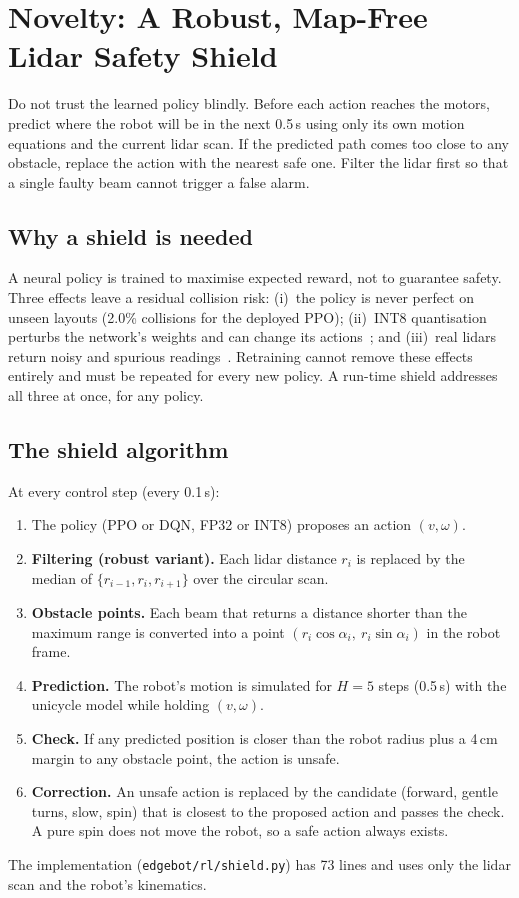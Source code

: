 \documentclass[12pt,a4paper,oneside]{report}
\begin{document}
\chapter{Novelty: A Robust, Map-Free Lidar Safety Shield}
\label{ch:novel}

\begin{tcolorbox}[novelty,title=\textbf{Key idea}]
Do not trust the learned policy blindly. Before each action reaches the motors, predict where the robot will be in
the next 0.5\,s using only its own motion equations and the current lidar scan. If the predicted path comes too
close to any obstacle, replace the action with the nearest safe one. Filter the lidar first so that a single faulty
beam cannot trigger a false alarm.
\end{tcolorbox}

\section{Why a shield is needed}
A neural policy is trained to maximise expected reward, not to guarantee safety. Three effects leave a residual
collision risk: (i)~the policy is never perfect on unseen layouts (2.0\% collisions for the deployed PPO);
(ii)~INT8 quantisation perturbs the network's weights and can change its actions~\cite{quarl,quantprune2024}; and
(iii)~real lidars return noisy and spurious readings~\cite{omni2025}. Retraining cannot remove these effects
entirely and must be repeated for every new policy. A run-time shield addresses all three at once, for any policy.

\section{The shield algorithm}
At every control step (every 0.1\,s):
\begin{enumerate}
\item The policy (PPO or DQN, FP32 or INT8) proposes an action $(v,\omega)$.
\item \textbf{Filtering (robust variant).} Each lidar distance $r_i$ is replaced by the median of
$\{r_{i-1},r_i,r_{i+1}\}$ over the circular scan.
\item \textbf{Obstacle points.} Each beam that returns a distance shorter than the maximum range is converted into a
point $(r_i\cos\alpha_i,\ r_i\sin\alpha_i)$ in the robot frame.
\item \textbf{Prediction.} The robot's motion is simulated for $H=5$ steps (0.5\,s) with the unicycle model while
holding $(v,\omega)$.
\item \textbf{Check.} If any predicted position is closer than the robot radius plus a 4\,cm margin to any obstacle
point, the action is unsafe.
\item \textbf{Correction.} An unsafe action is replaced by the candidate (forward, gentle turns, slow, spin) that is
closest to the proposed action and passes the check. A pure spin does not move the robot, so a safe action always
exists.
\end{enumerate}
The implementation (\texttt{edgebot/rl/shield.py}) has 73 lines and uses only the lidar scan and the robot's
kinematics.
\end{document}
